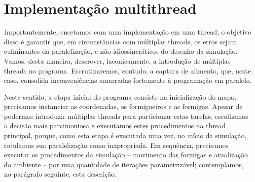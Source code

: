 \documentclass[12pt]{article}
\theoremstyle{definition}
\begin{document}
\section{Implementação multithread} 

Importantemente, encetamos com uma implementação em uma thread; o objetivo disso é garantir que, em circunstâncias com múltiplas threads, os erros sejam culminantes da paralelização, e não idiossincráticos do desenho da simulação. Vamos, desta maneira, descrever, laconicamente, a introdução de múltiplas threads no programa. Escrutinaremos, contudo, a captura de alimento, que, neste caso, consolida inconveniências amarradas fortemente à programação em paralelo. 

Neste sentido, a etapa inicial do programa consiste na inicialização do mapa; precisamos instanciar as coordenadas, os formigueiros e as formigas. Apesar de podermos introduzir múltiplas threads para particionar estas tarefas, escolhemos a decisão mais parcimoniosa e executamos estes procedimentos na thread principal, porque, como esta etapa é executada uma vez, no início da simulação, rotulamos sua paralelização como inapropriada. Em sequência, precisamos executar os procedimentos da simulação -- movimento das formigas e atualização do ambiente -- por uma quantidade de iterações parametrizável; contemplamos, no parágrafo seguinte, esta descrição. 
\end{document}
